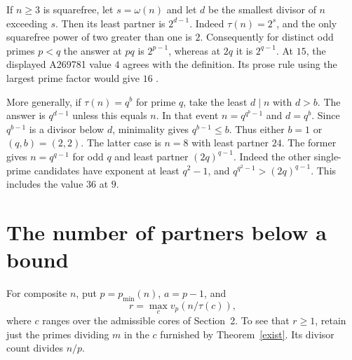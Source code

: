 \documentclass[11pt]{article}
\newcommand{\least}{p_{\min}}
\begin{document}
If $n\ge3$ is squarefree, let $s=\omega(n)$ and let $d$ be the smallest divisor of $n$ exceeding $s$. Then its least partner is $2^{d-1}$. Indeed $\tau(n)=2^s$, and the only squarefree power of two greater than one is $2$. Consequently for distinct odd primes $p<q$ the answer at $pq$ is $2^{p-1}$, whereas at $2q$ it is $2^{q-1}$. At $15$, the displayed A269781 value $4$ agrees with the definition. Its prose rule using the largest prime factor would give $16$ \cite{oeis}.

More generally, if $\tau(n)=q^b$ for prime $q$, take the least $d\mid n$ with $d>b$. The answer is $q^{d-1}$ unless this equals $n$. In that event $n=q^{q^b-1}$ and $d=q^b$. Since $q^{b-1}$ is a divisor below $d$, minimality gives $q^{b-1}\le b$. Thus either $b=1$ or $(q,b)=(2,2)$. The latter case is $n=8$ with least partner $24$. The former gives $n=q^{q-1}$ for odd $q$ and least partner $(2q)^{q-1}$. Indeed the other single-prime candidates have exponent at least $q^2-1$, and $q^{q^2-1}>(2q)^{q-1}$. This includes the value $36$ at $9$.

\clearpage
\section{The number of partners below a bound}
For composite $n$, put $p=\least(n)$, $a=p-1$, and
\[
  r=\max_{c} v_p(n/\tau(c)),
\]
where $c$ ranges over the admissible cores of Section~2. To see that $r\ge1$, retain just the primes dividing $m$ in the $c$ furnished by Theorem~\ref{exist}. Its divisor count divides $n/p$.
\end{document}

